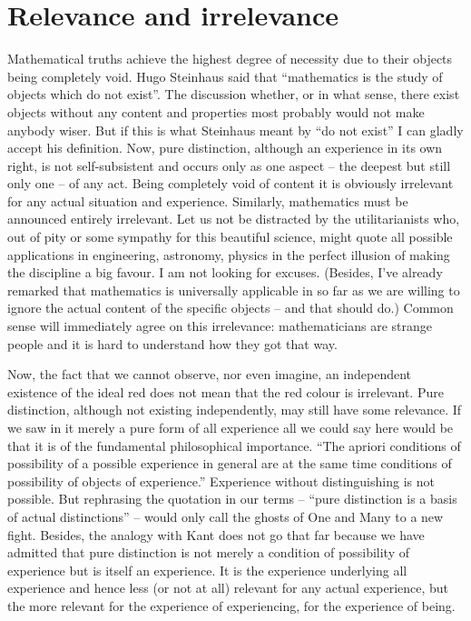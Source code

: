 \section{Relevance and irrelevance}\label{se:relevant}
Mathematical truths achieve the highest degree of necessity due to their objects being completely void. Hugo Steinhaus said that ``mathematics is the study of objects which do not exist''. The discussion whether, or in what sense, there exist objects without any content and properties most probably would not make anybody wiser. But if this is what Steinhaus meant by ``do not exist'' I can gladly accept his definition. Now, pure distinction, although an experience in its own right, is not self-subsistent and occurs only as one aspect -- the deepest but still only one -- of any act. Being completely void of content it is obviously irrelevant for any actual situation and experience. Similarly, mathematics must be announced entirely irrelevant. Let us not be distracted by the utilitarianists who, out of pity or some sympathy for this beautiful science, might quote all possible applications in engineering, astronomy, physics in the perfect illusion of making the discipline a big favour. I am not looking for excuses. (Besides, I've already remarked that mathematics is universally applicable in so far as we are willing to ignore the actual content of the specific objects -- and that should do.) Common sense will immediately agree on this irrelevance: mathematicians are strange people and it is hard to understand how they got that way.

Now, the fact that we cannot observe, nor even imagine, an independent existence of the ideal red does not mean that the red colour is irrelevant. Pure distinction, although not existing independently, may still have some relevance. If we saw in it merely a pure form of all experience all we could say here would be that it is of the fundamental philosophical importance. ``The apriori conditions of possibility of a possible experience in general are at the same time conditions of possibility of objects of experience.'' Experience without distinguishing is not possible. But rephrasing the quotation in our terms -- ``pure distinction is a basis of actual distinctions'' -- would only call the ghosts of One and Many to a new fight. Besides, the analogy with Kant does not go that far because we have admitted that pure distinction is not merely a condition of possibility of experience but is itself an experience. It is the experience underlying all experience and hence less (or not at all) relevant for any actual experience, but the more relevant for the experience of experiencing, for the experience of being.

